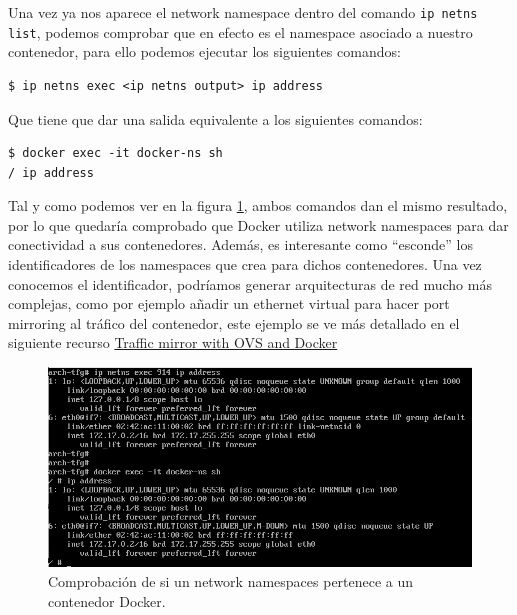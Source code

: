 \documentclass[a4paper, oneside, 12pt]{book}
\begin{document}
	\noindent Una vez ya nos aparece el network namespace dentro del comando \texttt{ip netns list}, podemos comprobar que en efecto es el namespace asociado a nuestro contenedor, para ello podemos ejecutar los siguientes comandos:
	
	\begin{verbatim}
$ ip netns exec <ip netns output> ip address
	\end{verbatim}

	\noindent Que tiene que dar una salida equivalente a los siguientes comandos:
	
	\begin{verbatim}
$ docker exec -it docker-ns sh
/ ip address
	\end{verbatim}

	\noindent Tal y como podemos ver en la figura \ref{img: comprobacion ns docker}, ambos comandos dan el mismo resultado, por lo que quedaría comprobado que Docker utiliza network namespaces para dar conectividad a sus contenedores. Además, es interesante como ``esconde'' los identificadores de los namespaces que crea para dichos contenedores. Una vez conocemos el identificador, podríamos generar arquitecturas de red mucho más complejas, como por ejemplo añadir un ethernet virtual para hacer port mirroring al tráfico del contenedor, este ejemplo se ve más detallado en el siguiente recurso \href{https://arthurchiao.art/blog/traffic-mirror-with-ovs/}{Traffic mirror with OVS and Docker}

	\pagebreak

	\begin{figure}[h!]
		\begin{center}
			\includegraphics[width=1\textwidth]{img/docker_ns4.png}
			\caption{Comprobación de si un network namespaces pertenece a un contenedor Docker.}
			\label{img: comprobacion ns docker}
		\end{center}
	\end{figure}
\end{document}

